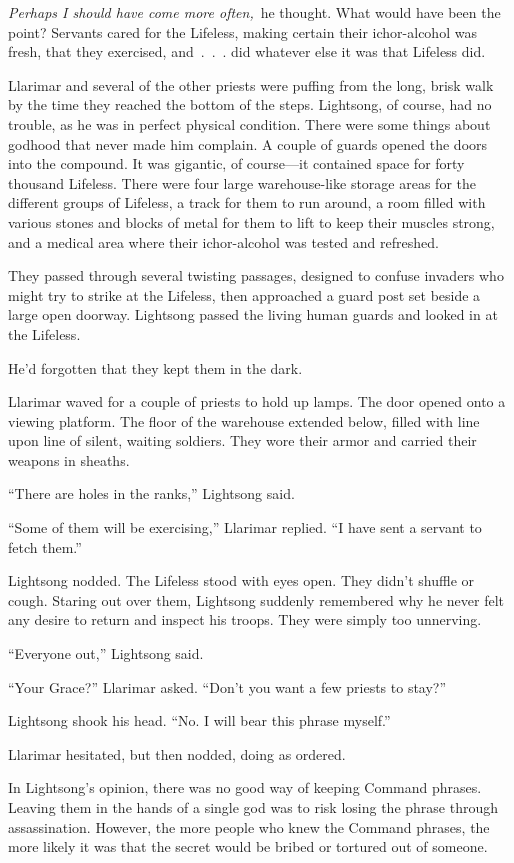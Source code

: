 \textit{Perhaps I should have come more often,}~he thought. What would have been the point? Servants cared for the Lifeless, making certain their ichor-alcohol was fresh, that they exercised, and~.~.~. did whatever else it was that Lifeless did.

Llarimar and several of the other priests were puffing from the long, brisk walk by the time they reached the bottom of the steps. Lightsong, of course, had no trouble, as he was in perfect physical condition. There were some things about godhood that never made him complain. A couple of guards opened the doors into the compound. It was gigantic, of course—it contained space for forty thousand Lifeless. There were four large warehouse-like storage areas for the different groups of Lifeless, a track for them to run around, a room filled with various stones and blocks of metal for them to lift to keep their muscles strong, and a medical area where their ichor-alcohol was tested and refreshed.

They passed through several twisting passages, designed to confuse invaders who might try to strike at the Lifeless, then approached a guard post set beside a large open doorway. Lightsong passed the living human guards and looked in at the Lifeless.

He’d forgotten that they kept them in the dark.

Llarimar waved for a couple of priests to hold up lamps. The door opened onto a viewing platform. The floor of the warehouse extended below, filled with line upon line of silent, waiting soldiers. They wore their armor and carried their weapons in sheaths.

“There are holes in the ranks,” Lightsong said.

“Some of them will be exercising,” Llarimar replied. “I have sent a servant to fetch them.”

Lightsong nodded. The Lifeless stood with eyes open. They didn’t shuffle or cough. Staring out over them, Lightsong suddenly remembered why he never felt any desire to return and inspect his troops. They were simply too unnerving.

“Everyone out,” Lightsong said.

“Your Grace?” Llarimar asked. “Don’t you want a few priests to stay?”

Lightsong shook his head. “No. I will bear this phrase myself.”

Llarimar hesitated, but then nodded, doing as ordered.

In Lightsong’s opinion, there was no good way of keeping Command phrases. Leaving them in the hands of a single god was to risk losing the phrase through assassination. However, the more people who knew the Command phrases, the more likely it was that the secret would be bribed or tortured out of someone.

